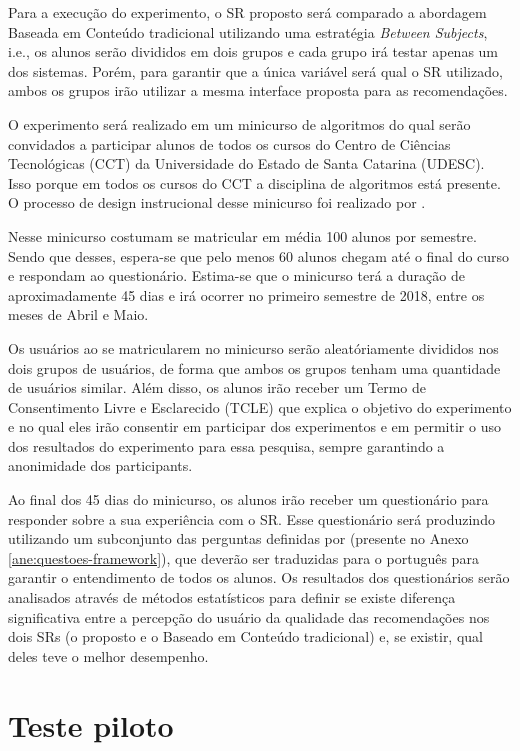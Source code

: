 Para a execução do experimento, o SR proposto será comparado a abordagem Baseada em Conteúdo tradicional utilizando uma
estratégia \textit{Between Subjects}, i.e., os alunos serão divididos em dois grupos e cada grupo irá testar apenas
um dos sistemas. Porém, para garantir que a única variável será qual o SR utilizado, ambos os grupos irão utilizar a mesma
interface proposta para as recomendações.

O experimento será realizado em um minicurso de algoritmos do qual serão convidados a participar alunos de todos os cursos do Centro de
Ciências Tecnológicas (CCT) da Universidade do Estado de Santa Catarina (UDESC). Isso porque em todos os cursos do CCT
a disciplina de algoritmos está presente. O processo de design instrucional desse minicurso foi realizado por .

Nesse minicurso costumam se matricular em média 100 alunos por semestre. Sendo que desses, espera-se que pelo menos 60 alunos chegam até
o final do curso e respondam ao questionário. Estima-se que o minicurso terá a duração de aproximadamente 45 dias e irá ocorrer no primeiro semestre
de 2018, entre os meses de Abril e Maio.

Os usuários ao se matricularem no minicurso serão aleatóriamente divididos nos dois grupos de usuários, de forma que ambos
os grupos tenham uma quantidade de usuários similar. Além disso, os alunos irão receber um Termo de Consentimento Livre
e Esclarecido (TCLE) que explica o objetivo do experimento e no qual eles irão consentir em participar dos experimentos e
em permitir o uso dos resultados do experimento para essa pesquisa, sempre garantindo a anonimidade dos participants.

Ao final dos 45 dias do minicurso, os alunos irão receber um questionário para responder sobre a sua experiência com o SR.
Esse questionário será produzindo utilizando um subconjunto das perguntas definidas por  (presente no
Anexo \ref{ane:questoes-framework}), que deverão ser traduzidas para o português para garantir o entendimento de todos os alunos.
Os resultados dos questionários serão  analisados através de métodos estatísticos para definir se existe diferença
significativa entre a percepção do usuário da qualidade das recomendações nos dois SRs (o proposto e o Baseado em Conteúdo tradicional) e, se existir,
qual deles teve o melhor desempenho.

\section{Teste piloto}


